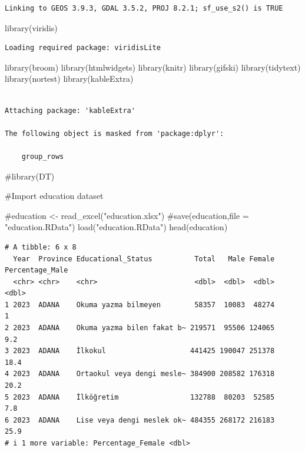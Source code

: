 \documentclass[
  11pt,
  a4paper,
  DIV=11,
  numbers=noendperiod]{scrartcl}
\newenvironment{Shaded}{\begin{snugshade}}{\end{snugshade}}
\newcommand{\CommentTok}[1]{\textcolor[rgb]{0.37,0.37,0.37}{#1}}
\newcommand{\FunctionTok}[1]{\textcolor[rgb]{0.28,0.35,0.67}{#1}}
\newcommand{\NormalTok}[1]{\textcolor[rgb]{0.00,0.23,0.31}{#1}}
\newcommand{\StringTok}[1]{\textcolor[rgb]{0.13,0.47,0.30}{#1}}
\begin{document}
\begin{verbatim}
Linking to GEOS 3.9.3, GDAL 3.5.2, PROJ 8.2.1; sf_use_s2() is TRUE
\end{verbatim}

\begin{Shaded}
\begin{Highlighting}[]
\FunctionTok{library}\NormalTok{(viridis)}
\end{Highlighting}
\end{Shaded}

\begin{verbatim}
Loading required package: viridisLite
\end{verbatim}

\begin{Shaded}
\begin{Highlighting}[]
\FunctionTok{library}\NormalTok{(broom)}
\FunctionTok{library}\NormalTok{(htmlwidgets)}
\FunctionTok{library}\NormalTok{(knitr)}
\FunctionTok{library}\NormalTok{(gifski)}
\FunctionTok{library}\NormalTok{(tidytext)}
\FunctionTok{library}\NormalTok{(nortest)}
\FunctionTok{library}\NormalTok{(kableExtra)}
\end{Highlighting}
\end{Shaded}

\begin{verbatim}

Attaching package: 'kableExtra'

The following object is masked from 'package:dplyr':

    group_rows
\end{verbatim}

\begin{Shaded}
\begin{Highlighting}[]
\CommentTok{\#library(DT)}

\CommentTok{\#Import education dataset}

\CommentTok{\#education \textless{}{-} read\_excel("education.xlsx")}
\CommentTok{\#save(education,file = "education.RData")}
\FunctionTok{load}\NormalTok{(}\StringTok{"education.RData"}\NormalTok{)}
\FunctionTok{head}\NormalTok{(education)}
\end{Highlighting}
\end{Shaded}

\begin{verbatim}
# A tibble: 6 x 8
  Year  Province Educational_Status          Total   Male Female Percentage_Male
  <chr> <chr>    <chr>                       <dbl>  <dbl>  <dbl>           <dbl>
1 2023  ADANA    Okuma yazma bilmeyen        58357  10083  48274             1  
2 2023  ADANA    Okuma yazma bilen fakat b~ 219571  95506 124065             9.2
3 2023  ADANA    İlkokul                    441425 190047 251378            18.4
4 2023  ADANA    Ortaokul veya dengi mesle~ 384900 208582 176318            20.2
5 2023  ADANA    İlköğretim                 132788  80203  52585             7.8
6 2023  ADANA    Lise veya dengi meslek ok~ 484355 268172 216183            25.9
# i 1 more variable: Percentage_Female <dbl>
\end{verbatim}
\end{document}
